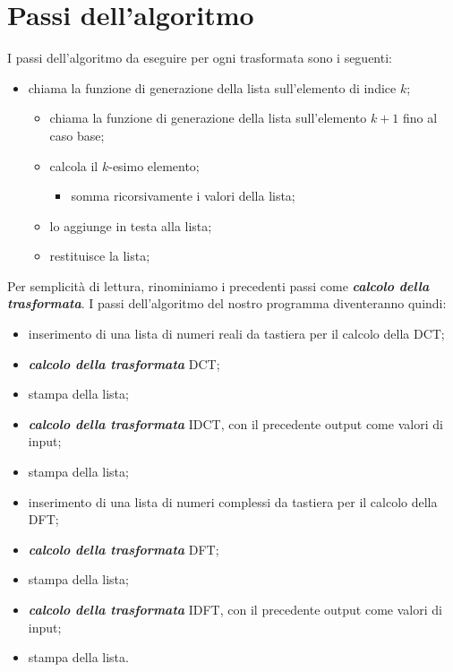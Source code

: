 \documentclass{report}
\begin{document}
  \newpage
	\section{Passi dell'algoritmo}
	I passi dell'algoritmo da eseguire per ogni trasformata sono i seguenti:

  \begin{itemize}
    \item chiama la funzione di generazione della lista sull'elemento di indice $k$;
		\begin{itemize}
      \item chiama la funzione di generazione della lista sull'elemento $k+1$ fino al caso base;
      \item calcola il $k$-esimo elemento;
      \begin{itemize}
        \item somma ricorsivamente i valori della lista;
      \end{itemize}
      \item lo aggiunge in testa alla lista;
      \item restituisce la lista;
    \end{itemize} 

  \end{itemize}

  \noindent Per semplicità di lettura, rinominiamo i precedenti passi come \textbf{\textit{calcolo della trasformata}}.
  I passi dell'algoritmo del nostro programma diventeranno quindi:

	\begin{itemize}
		\item inserimento di una lista di numeri reali da tastiera per il calcolo della DCT;
    \item \textbf{\textit{calcolo della trasformata}} DCT;
    \item stampa della lista;
    \item \textbf{\textit{calcolo della trasformata}} IDCT, con il precedente output come valori di input;
    \item stampa della lista;
		\item inserimento di una lista di numeri complessi da tastiera per il calcolo della DFT;
    \item \textbf{\textit{calcolo della trasformata}} DFT;
    \item stampa della lista;
    \item \textbf{\textit{calcolo della trasformata}} IDFT, con il precedente output come valori di input;
    \item stampa della lista.


	\end{itemize}
	
\end{document}
